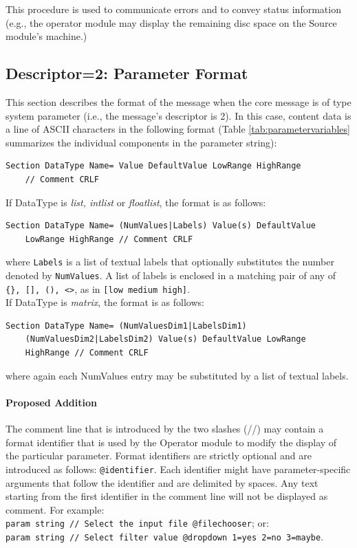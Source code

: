\documentclass[letterpaper,oneside,12pt]{book}
\newcommand{\todo}[1]{}
\begin{document}
This procedure is used to communicate errors and to convey status information (e.g.,
the operator module may display the remaining disc space on the Source module's
machine.)

\subsection{Descriptor=2: Parameter Format}
\label{parameter_format}

This section describes the format of the message when the core message is of 
type system parameter (i.e., the message's descriptor is 2). In this case, 
content data is a line of ASCII characters in the following format 
(Table \ref{tab:parametervariables} summarizes
the individual components in the parameter string):
\begin{verbatim}
Section DataType Name= Value DefaultValue LowRange HighRange
    // Comment CRLF
\end{verbatim}
If DataType is \textit{list, intlist} or \textit{floatlist}, the format is
as follows: 
\begin{verbatim}
Section DataType Name= (NumValues|Labels) Value(s) DefaultValue
    LowRange HighRange // Comment CRLF
\end{verbatim}
where \texttt{Labels} is a list of textual labels that optionally substitutes the number denoted by \texttt{NumValues}. A list of labels is enclosed in a matching pair of any of \verb|{}, [], (), <>|, as in 
\verb|[low medium high]|.
\\[2ex]
If DataType is \textit{matrix}, the format is as follows:
\begin{verbatim}
Section DataType Name= (NumValuesDim1|LabelsDim1)
    (NumValuesDim2|LabelsDim2) Value(s) DefaultValue LowRange
    HighRange // Comment CRLF
\end{verbatim}
where again each NumValues entry may be substituted by a list of textual labels.

\todo{Need to give a few examples of possible parameter lines and need
to describe the format of the encoding if values include spaces, etc.}

\paragraph{Proposed Addition} The comment line that is introduced by the two 
slashes (//) may contain a format identifier that is used by the Operator module
to modify the display of the particular parameter. Format identifiers are
strictly optional and are introduced as follows: \texttt{@identifier}. Each
identifier might have parameter-specific arguments that follow the identifier
and are delimited by spaces. Any text starting from the first identifier in
the comment line will not be displayed as comment. For example:\\
\texttt{param string // Select the input file @filechooser}; or:\\
\texttt{param string // Select filter value @dropdown 1=yes 2=no 3=maybe}.
\end{document}
